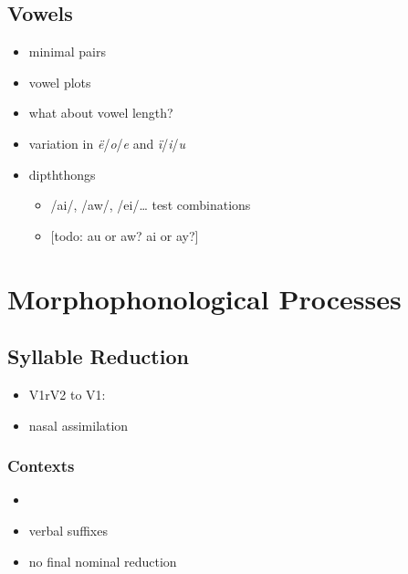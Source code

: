 \documentclass{memoir}
\begin{document}
\subsection{\texorpdfstring{Vowels \label{sec:vowels}}{Vowels }}

\begin{itemize}
\item
  minimal pairs
\item
  vowel plots
\item
  what about vowel length?
\item
  variation in \emph{ë}/\emph{o}/\emph{e} and \emph{ï}/\emph{i}/\emph{u}
\item
  dipththongs

  \begin{itemize}
  \tightlist
  \item
    /ai/, /aw/, /ei/\ldots{} test combinations
  \item
    {[}todo: au or aw? ai or ay?{]}
  \end{itemize}
\end{itemize}

\section{\texorpdfstring{Morphophonological Processes
\label{sec:morphophono}}{Morphophonological Processes }}

\subsection{\texorpdfstring{Syllable Reduction
\label{sec:sylred}}{Syllable Reduction }}

\begin{itemize}
\tightlist
\item
  V1rV2 to V1:
\item
  nasal assimilation
\end{itemize}

\subsubsection{Contexts}

\begin{itemize}
\item
\item
  verbal suffixes
\item
  no final nominal reduction
\end{itemize}
\end{document}
